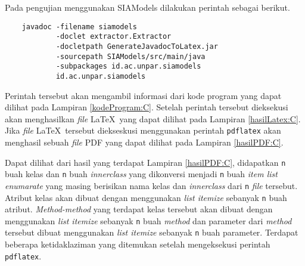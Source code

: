 Pada pengujian menggunakan SIAModels dilakukan perintah sebagai berikut.

\begin{verbatim}
	javadoc -filename siamodels
	        -doclet extractor.Extractor
	        -docletpath GenerateJavadocToLatex.jar
	        -sourcepath SIAModels/src/main/java
	        -subpackages id.ac.unpar.siamodels
	        id.ac.unpar.siamodels
\end{verbatim}

Perintah tersebut akan mengambil informasi dari kode program yang dapat dilihat pada Lampiran \ref{kodeProgram:C}. Setelah perintah tersebut dieksekusi akan menghasilkan {\it file} \LaTeX\ yang dapat dilihat pada Lampiran \ref{hasilLatex:C}. Jika {\it file} \LaTeX\ tersebut diekseskusi menggunakan perintah {\tt pdflatex} akan menghasil sebuah {\it file} PDF yang dapat dilihat pada Lampiran \ref{hasilPDF:C}.

Dapat dilihat dari hasil yang terdapat Lampiran \ref{hasilPDF:C}, didapatkan {\tt n} buah kelas dan {\tt n} buah {\it innerclass} yang dikonversi menjadi {\tt n} buah {\it item list enumarate} yang masing berisikan nama kelas dan {\it innerclass} dari {\tt n} {\it file} tersebut. Atribut kelas akan dibuat dengan menggunakan {\it list itemize} sebanyak {\tt n} buah atribut. {\it Method-method} yang terdapat kelas tersebut akan dibuat dengan menggunakan {\it list itemize} sebanyak {\tt n} buah {\it method} dan parameter dari {\it method} tersebut dibuat menggunakan {\it list itemize} sebanyak {\tt n} buah parameter. Terdapat beberapa ketidaklaziman yang ditemukan setelah mengeksekusi perintah {\tt pdflatex}.

